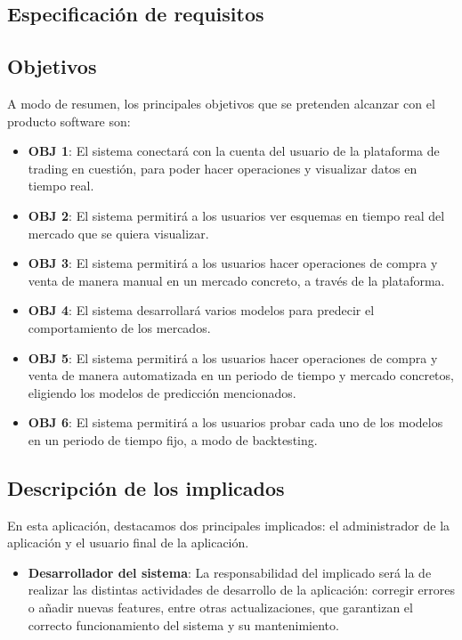 \begin{titlepage}
	
\chapter{Especificación de requisitos}

\section{Objetivos}

A modo de resumen, los principales objetivos que se pretenden alcanzar con el producto software
son:

\begin{itemize}
	
	\item \textbf{OBJ 1}: El sistema conectará con la cuenta del usuario de la plataforma de trading en cuestión, para poder hacer operaciones y visualizar datos en tiempo real.
	\item \textbf{OBJ 2}: El sistema permitirá a los usuarios ver esquemas en tiempo real del mercado que se quiera visualizar.
	\item \textbf{OBJ 3}: El sistema permitirá a los usuarios hacer operaciones de compra y venta de manera manual en un mercado concreto, a través de la plataforma.
	\item \textbf{OBJ 4}: El sistema desarrollará varios modelos para predecir el comportamiento de los mercados.
	\item \textbf{OBJ 5}: El sistema permitirá a los usuarios hacer operaciones de compra y venta de manera automatizada en un periodo de tiempo y mercado concretos, eligiendo los modelos de predicción mencionados.
	\item \textbf{OBJ 6}: El sistema permitirá a los usuarios probar cada uno de los modelos en un periodo de tiempo fijo, a modo de backtesting.
	
\end{itemize}

\section{Descripción de los implicados}

En esta aplicación, destacamos dos principales implicados: el administrador de la aplicación y el usuario final de la aplicación.

\begin{itemize}
	\item \textbf{Desarrollador del sistema}: La responsabilidad del implicado será la de realizar las distintas actividades de desarrollo de la aplicación: corregir errores o añadir nuevas features, entre otras actualizaciones, que garantizan el correcto funcionamiento del sistema y su mantenimiento.
	

\end{itemize}
\end{titlepage}
